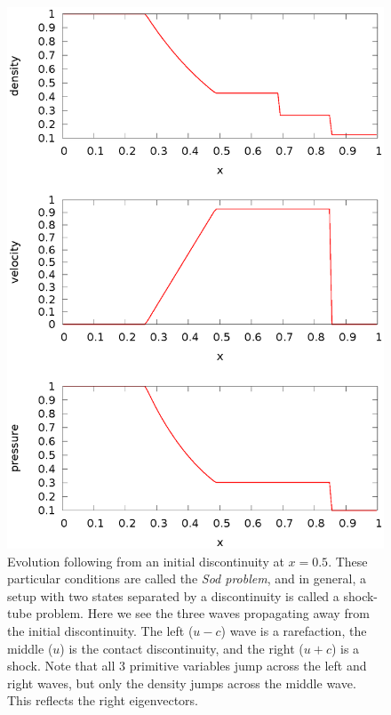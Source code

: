 \documentclass[11pt]{article}
\begin{document}
\begin{figure}
\centering
\includegraphics[width=6.0in]{sod}
\caption{\label{fig:sod} Evolution following from an initial discontinuity
at $x = 0.5$.  These particular conditions are called the {\em Sod problem},
and in general, a setup with two states separated by a discontinuity is
called a shock-tube problem.  Here we see the three waves propagating
away from the initial discontinuity.  The left ($u-c$) wave is a rarefaction,
the middle ($u$) is the contact discontinuity, and the right ($u+c$) is a shock. Note that all 3 primitive variables jump across the left and right waves,
but only the density jumps across the middle wave.  This reflects the
right eigenvectors.}
\end{figure}


\end{document}
